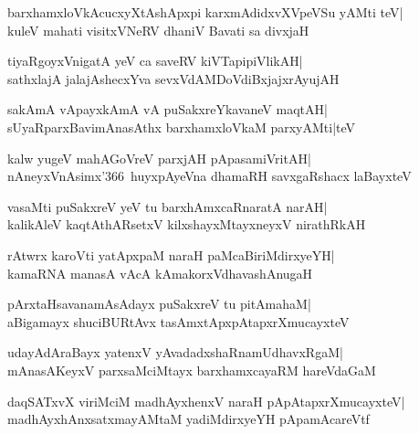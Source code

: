 \documentclass[twoside,12pt,openright]{book}
\newcounter{shloka}[chapter]
\begin{document}
\begin{shloka}%
barxhamxloVkAcucxyXtAshApxpi karxmAdidxvXVpeVSu yAMti teV|\\
kuleV mahati visitxVNeRV dhaniV Bavati sa divxjaH
\end{shloka}

\begin{shloka}%
tiyaRgoyxVnigatA yeV ca saveRV kiVTapipiVlikAH|\\
sathxlajA jalajAshecxYva sevxVdAMDoVdiBxjajxrAyujAH
\end{shloka}

\begin{shloka}%
sakAmA vApayxkAmA vA puSakxreYkavaneV maqtAH|\\
sUyaRparxBavimAnasAthx barxhamxloVkaM parxyAMti|teV
\end{shloka}

\begin{shloka}%
kalw yugeV mahAGoVreV parxjAH pApasamiVritAH|\\
nAneyxVnAsimx\char'366\ huyxpAyeVna dhamaRH savxgaRshacx laBayxteV
\end{shloka}

\begin{shloka}%
vasaMti puSakxreV yeV tu barxhAmxcaRnaratA narAH|\\
kalikAleV kaqtAthARsetxV kilxshayxMtayxneyxV nirathRkAH
\end{shloka}

\begin{shloka}%
rAtwrx karoVti yatApxpaM naraH paMcaBiriMdirxyeYH|\\
kamaRNA manasA vAcA kAmakorxVdhavashAnugaH
\end{shloka}

\begin{shloka}%
pArxtaHsavanamAsAdayx puSakxreV tu pitAmahaM|\\
aBigamayx shuciBURtAvx tasAmxtApxpAtapxrXmucayxteV
\end{shloka}

\begin{shloka}%
udayAdAraBayx yatenxV yAvadadxshaRnamUdhavxRgaM|\\
mAnasAKeyxV parxsaMciMtayx barxhamxcayaRM hareVdaGaM
\end{shloka}

\begin{shloka}%
daqSATxvX viriMciM madhAyxhenxV naraH pApAtapxrXmucayxteV|\\
madhAyxhAnxsatxmayAMtaM yadiMdirxyeYH pApamAcareVtf
\end{shloka}
\end{document}
